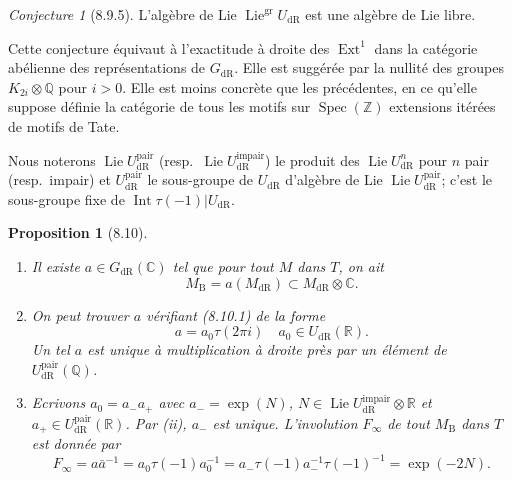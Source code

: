 \documentclass[12pt,a4paper]{article}
\theoremstyle{plain}
\newtheorem{proposition}[theorem]{Proposition}
\theoremstyle{definition}
\theoremstyle{remark}
\newtheorem{conjecture}[theorem]{Conjecture}
\DeclareMathOperator{\Spec}{Spec}
\DeclareMathOperator{\Ext}{Ext}
\DeclareMathOperator{\Lie}{Lie}
\DeclareMathOperator{\Int}{Int}
\newcommand{\gr}{\mathrm{gr}}
\newcommand{\DR}{\mathrm{dR}}
\newcommand{\B}{\mathrm{B}}
\newcommand{\Z}{\mathbb{Z}}
\newcommand{\Q}{\mathbb{Q}}
\newcommand{\C}{\mathbb{C}}
\newcommand{\R}{\mathbb{R}}
\begin{document}
\begin{conjecture}[8.9.5]\label{conj:8.9.5}
L'alg\`ebre de Lie $\Lie^\gr U_\DR$ est une alg\`ebre de Lie libre.
\end{conjecture}

Cette conjecture \'equivaut \`a l'exactitude \`a droite des $\Ext^1$ dans la cat\'egorie ab\'elienne des repr\'esentations de $G_\DR$. Elle est sugg\'er\'ee par la nullit\'e des groupes $K_{2i} \otimes \Q$ pour $i > 0$. Elle est moins concr\`ete que les pr\'ec\'edentes, en ce qu'elle suppose d\'efinie la cat\'egorie de tous les motifs sur $\Spec(\Z)$ extensions it\'er\'ees de motifs de Tate.

Nous noterons $\Lie U_\DR^{\mathrm{pair}}$ (resp.~$\Lie U_\DR^{\mathrm{impair}}$) le produit des $\Lie U_\DR^n$ pour $n$ pair (resp.~impair) et $U_\DR^{\mathrm{pair}}$ le sous-groupe de $U_\DR$ d'alg\`ebre de Lie $\Lie U_\DR^{\mathrm{pair}}$; c'est le sous-groupe fixe de $\Int \tau(-1)|U_\DR$.

\begin{proposition}[8.10]\label{prop:8.10}
\begin{enumerate}[label=(\roman*)]
\item Il existe $a \in G_\DR(\C)$ tel que pour tout $M$ dans $T$, on ait
\begin{equation*}\tag{8.10.1}
M_\B = a(M_\DR) \subset M_\DR \otimes \C.
\end{equation*}
\item On peut trouver $a$ v\'erifiant (8.10.1) de la forme
\begin{equation*}\tag{8.10.2}
a = a_0 \tau(2\pi i) \quad a_0 \in U_\DR(\R).
\end{equation*}
Un tel $a$ est unique \`a multiplication \`a droite pr\`es par un \'el\'ement de $U_\DR^{\mathrm{pair}}(\Q)$.

\item Ecrivons $a_0 = a_- a_+$ avec $a_- = \exp(N)$, $N \in \Lie U_\DR^{\mathrm{impair}} \otimes \R$ et $a_+ \in U_\DR^{\mathrm{pair}}(\R)$. Par (ii), $a_-$ est unique. L'involution $F_\infty$ de tout $M_\B$ dans $T$ est donn\'ee par
\begin{equation*}\tag{8.10.3}
F_\infty = a\bar{a}^{-1} = a_0 \tau(-1) a_0^{-1} = a_- \tau(-1) a_-^{-1} \tau(-1)^{-1} = \exp(-2N).
\end{equation*}
\end{enumerate}
\end{proposition}
\end{document}
